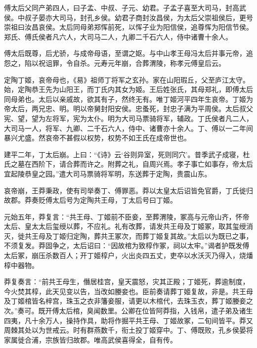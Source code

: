\documentclass[12pt,UTF8]{ctexbook}
\begin{document}
傅太后父同产弟四人，曰子孟、中叔、子元、幼君。子孟子喜至大司马，封高武侯。中叔子晏亦大司马，封孔乡侯。幼君子商封汝昌侯，为太后父崇祖侯后，更号崇祖曰汝昌哀侯。太后同母弟郑恽前死，以恽子业为阳信侯，追尊恽为阳信节侯。郑氏、傅氏侯者凡六人，大司马二人，九卿二千石六人，侍中诸曹十余人。



傅太后既尊，后尤骄，与成帝母语，至谓之妪。与中山孝王母冯太后并事元帝，追怨之，陷以祝诅罪，令自杀。元寿元年崩，合葬渭陵，称孝元傅皇后云。



定陶丁姬，哀帝母也，《易》祖师丁将军之玄孙。家在山阳瑕丘，父至庐江太守。始，定陶恭王先为山阳王，而丁氏内其女为姬。王后姓张氏，其母郑礼，即傅太后同母弟也。太后以亲戚故，欲其有子，然终无有。唯丁姬河平四年生哀帝。丁姬为帝太后，两兄忠、明。明以帝舅封阳安侯。忠蚤死，封忠子满为平周侯。太后叔父宪、望，望为左将军，宪为太仆。明为大司马票骑将军，辅政。丁氏侯者凡二人，大司马一人，将军、九卿、二千石六人，侍中、诸曹亦十余人。丁、傅以一二年间暴兴尤盛。然哀帝不甚假以权势，权势不如王氏在成帝世也。



建平二年，丁太后崩。上曰：“《诗》云‘谷则异室，死则同穴’。昔季武子成寝，杜氏之墓在西阶下，请合葬而许之。附葬之礼，自周兴焉。孝子事亡如事存，帝太后宜起陵恭皇之园。”遣大司马票骑将军明，东送葬于定陶，贵震山东。



哀帝崩，王莽秉政，使有司举奏丁、傅罪恶。莽以太皇太后诏皆免官爵，丁氏徙归故郡。莽奏贬傅太后号为定陶共王母，丁太后号曰丁姬。



元始五年，莽复言：“共王母、丁姬前不臣妾，至葬渭陵，冢高与元帝山齐，怀帝太后、皇太太后玺绶以葬，不应礼。礼有改葬，请发共王母及丁姬冢，取其玺绶消灭，徙共王母及丁姬归定陶，葬共王冢次，而葬丁姬复其故。”太后以为既已之事，不须复发。莽固争之，太后诏曰：“因故棺为致椁作冢，祠以太牢。”谒者护既发傅太后冢，崩压杀数百人；开丁姬椁户，火出炎四五丈，吏卒以水沃灭乃得入，烧燔椁中器物。



莽复奏言：“前共王母生，僭居桂宫，皇天震怒，灾其正殿；丁姬死，葬逾制度，今火焚其椁，此天见变以告，当改如媵妾也。臣前奏请葬丁姬复故，非是。共王母及丁姬棺皆名梓宫，珠玉之衣非籓妾服，请更以木棺代，去珠玉衣，葬丁姬媵妾之次。”奏可。既开傅太后棺，臭闻数里。公卿在位皆阿莽指，入钱帛，遣子弟及诸生四夷，凡十余万人，操持作具，助将作掘平共王母、丁姬故冢，二旬间皆平。莽又周棘其处以为世戒云。时有群燕数千，衔土投丁姬穿中。丁、傅既败，孔乡侯晏将家属徙合浦，宗族皆归故郡。唯高武侯喜得全，自有传。
\end{document}
